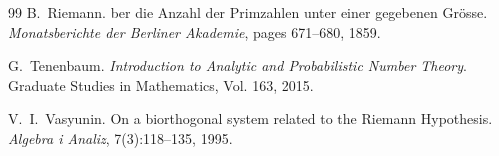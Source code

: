\documentclass[11pt,a4paper]{article}
\theoremstyle{plain}
\theoremstyle{definition}
\theoremstyle{remark}
\begin{document}
\begin{thebibliography}{99}
B.~Riemann.
ber die {A}nzahl der {P}rimzahlen unter einer gegebenen {G}r{\"o}sse.
\newblock \emph{Monatsberichte der Berliner Akademie}, pages 671--680, 1859.

G.~Tenenbaum.
\newblock \emph{Introduction to Analytic and Probabilistic Number Theory}.
\newblock Graduate Studies in Mathematics, Vol. 163, 2015.

V.~I.~Vasyunin.
\newblock On a biorthogonal system related to the {R}iemann {H}ypothesis.
\newblock \emph{Algebra i Analiz}, 7(3):118--135, 1995.

\end{thebibliography}
\end{document}
